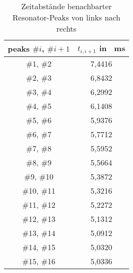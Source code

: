 \begin{appendix}
\begin{table}[!h]
    \centering
    \begin{tabular}{|c|c|}
        \hline
         peaks  $\#i$, $\#i+1$    &   $t_{i, i+1}$ in \SI{}{\milli \second} \\
         \hline
         \hline
         \#1, \#2    &   7,4416         \\
         \hline
         \#2, \#3    &   6,8432         \\
         \hline
         \#3, \#4    &   6,2992         \\
         \hline
         \#4, \#5    &   6,1408         \\
         \hline
         \#5, \#6    &   5,9376         \\
         \hline
         \#6, \#7    &   5,7712         \\
         \hline
         \#7, \#8    &   5,5952         \\
         \hline
         \#8, \#9    &   5,5664         \\
         \hline
         \#9, \#10   &   5,3872         \\
         \hline
         \#10, \#11  &   5,3216         \\
         \hline
         \#11, \#12  &   5,2272         \\
         \hline
         \#12, \#13  &   5,1312         \\
         \hline
         \#13, \#14  &   5,0912         \\
         \hline
         \#14, \#15  &   5,0320         \\
         \hline
         \#15, \#16  &   5,0336         \\
         \hline
    \end{tabular}
    \caption{Zeitabstände benachbarter Resonator-Peaks von links nach rechts}
    \label{tab:time-distances}
\end{table}

\cleardoublepage{}

\end{appendix}